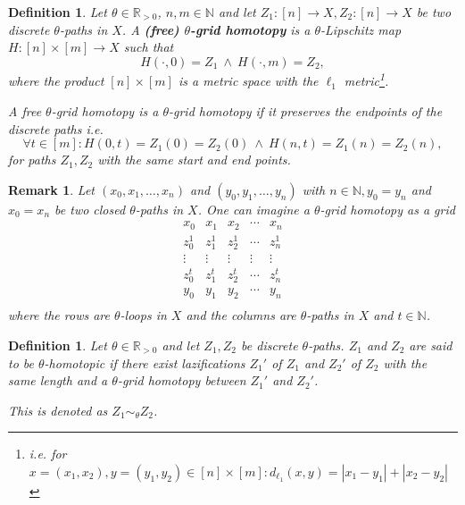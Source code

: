 \documentclass[a4paper, 11pt, twoside]{article}
\newcommand{\R}[0]{\mathbb{R}}
\newcommand{\N}[0]{\mathbb{N}}
\theoremstyle{break}
\theoremstyle{break}
\newtheorem{defin}[thm]{Definition}
\newtheorem{rem}[thm]{Remark}
\begin{document}
\begin{defin}
  Let $\theta \in \R_{>0}$, $n,m \in \N$ and let $Z_1\colon [n] \to X, Z_2: [n] \to X$ be two discrete $\theta$-paths in $X$. 
  A \textbf{(free) $\theta$-grid homotopy} is a $\theta$-Lipschitz map $H\colon [n] \times [m] \to X$ such that
  \begin{equation*}
    H(\cdot, 0) = Z_1 \: \land \: H(\cdot, m) = Z_2,
  \end{equation*}
  where the product $[n] \times [m]$ is a metric space with the $\ell_1$ metric\footnote{i.e. for $x = (x_1, x_2), y = (y_1, y_2) \in [n] \times [m]\colon d_{\ell_1}(x, y) = |x_1 - y_1| + |x_2 - y_2|$}.

  A free $\theta$-grid homotopy is a $\theta$-grid homotopy if it preserves the endpoints of the discrete paths i.e.
  \begin{equation*}
    \forall t\in [m]\colon H(0,t) = Z_1(0) = Z_2(0) \: \land \: H(n,t) = Z_1(n) = Z_2(n),
  \end{equation*}
  for paths $Z_1, Z_2$ with the same start and end points.

  \cite[p. 3]{vigolo2018fundamental}
\end{defin}

\begin{rem}
  Let $(x_0, x_1, \ldots, x_n)$ and $(y_0, y_1, \ldots, y_n)$ with $n \in \N, y_0 = y_n$ and $x_0 = x_n$ be two closed $\theta$-paths in $X$. 
  One can imagine a $\theta$-grid homotopy as a grid
  \begin{equation*}
    \begin{matrix}
      x_0 & x_1 & x_2 & \cdots & x_n \\
      z_0^1 & z_1^1 & z_2^1 & \cdots & z_n^1 \\
      \vdots & \vdots & \vdots & \vdots & \vdots \\
      z_0^{t} & z_1^{t} & z_2^{t} & \cdots & z_n^{t} \\
      y_0 & y_1 & y_2 & \cdots & y_n \\
    \end{matrix}
  \end{equation*}
  where the rows are $\theta$-loops in $X$ and the columns are $\theta$-paths in $X$ and $t\in \N$.

  \cite[p. 3, Def. 2.2]{barcelo2014discrete}
\end{rem}

\begin{defin}
  Let $\theta \in \R_{>0}$ and let $Z_1, Z_2$ be discrete $\theta$-paths. $Z_1$ and $Z_2$ are said to be $\theta$-homotopic 
  if there exist lazifications $Z_1'$ of $Z_1$ and $Z_2'$ of $Z_2$ with the same length and a $\theta$-grid homotopy between $Z_1'$ and $Z_2'$.
  
  This is denoted as $Z_1 \sim_{\theta} Z_2$.

  \cite[p. 3, Def. 2.2]{vigolo2018fundamental}
\end{defin}
\end{document}
